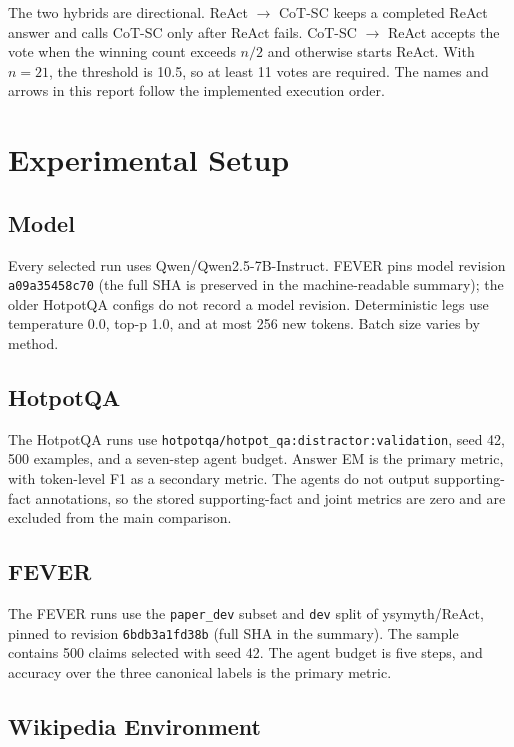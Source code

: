 \documentclass[10pt]{article}
\newcommand{\code}[1]{\texttt{#1}}
\begin{document}
The two hybrids are directional. ReAct $\rightarrow$ CoT-SC keeps a completed ReAct answer and calls CoT-SC only after ReAct fails. CoT-SC $\rightarrow$ ReAct accepts the vote when the winning count exceeds $n/2$ and otherwise starts ReAct. With $n=21$, the threshold is 10.5, so at least 11 votes are required. The names and arrows in this report follow the implemented execution order.

\section{Experimental Setup}

\subsection{Model}

Every selected run uses Qwen/Qwen2.5-7B-Instruct. FEVER pins model revision \code{a09a35458c70} (the full SHA is preserved in the machine-readable summary); the older HotpotQA configs do not record a model revision. Deterministic legs use temperature 0.0, top-p 1.0, and at most 256 new tokens. Batch size varies by method.

\subsection{HotpotQA}

The HotpotQA runs use \code{hotpotqa/hotpot\_qa:distractor:validation}, seed 42, 500 examples, and a seven-step agent budget. Answer EM is the primary metric, with token-level F1 as a secondary metric. The agents do not output supporting-fact annotations, so the stored supporting-fact and joint metrics are zero and are excluded from the main comparison.

\subsection{FEVER}

The FEVER runs use the \code{paper\_dev} subset and \code{dev} split of ysymyth/ReAct, pinned to revision \code{6bdb3a1fd38b} (full SHA in the summary). The sample contains 500 claims selected with seed 42. The agent budget is five steps, and accuracy over the three canonical labels is the primary metric.

\subsection{Wikipedia Environment}
\end{document}
